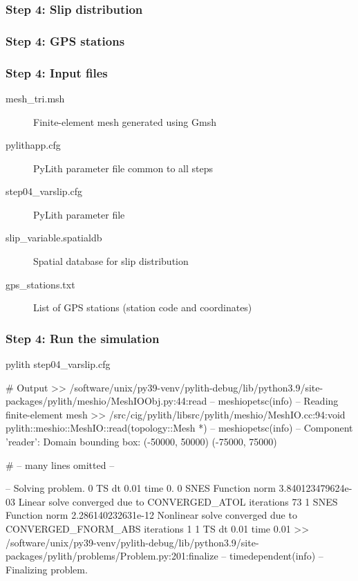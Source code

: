 \documentclass[aspectratio=169]{beamer}
\begin{document}
\begin{frame}
  \frametitle{Step 4: Slip distribution}
  \summary{}

    
\end{frame}


\begin{frame}
  \frametitle{Step 4: GPS stations}

    
\end{frame}


\begin{frame}
  \frametitle{Step 4: Input files}
  \summary{}

  \begin{description}
  \item[mesh\_tri.msh] Finite-element mesh generated using Gmsh
  \item[pylithapp.cfg] PyLith parameter file common to all steps
  \item[step04\_varslip.cfg] PyLith parameter file
  \item[slip\_variable.spatialdb] Spatial database for slip distribution
  \item[gps\_stations.txt] List of GPS stations (station code and coordinates)
  \end{description}
    
\end{frame}


\begin{frame}[fragile]
  \frametitle{Step 4: Run the simulation}
  \summary{}

\begin{bashcode}
pylith step04_varslip.cfg

# Output
 >> /software/unix/py39-venv/pylith-debug/lib/python3.9/site-packages/pylith/meshio/MeshIOObj.py:44:read
 -- meshiopetsc(info)
 -- Reading finite-element mesh
 >> /src/cig/pylith/libsrc/pylith/meshio/MeshIO.cc:94:void pylith::meshio::MeshIO::read(topology::Mesh *)
 -- meshiopetsc(info)
 -- Component 'reader': Domain bounding box:
    (-50000, 50000)
    (-75000, 75000)

# -- many lines omitted --

 -- Solving problem.
0 TS dt 0.01 time 0.
    0 SNES Function norm 3.840123479624e-03
    Linear solve converged due to CONVERGED_ATOL iterations 73
    1 SNES Function norm 2.286140232631e-12
  Nonlinear solve converged due to CONVERGED_FNORM_ABS iterations 1
1 TS dt 0.01 time 0.01
 >> /software/unix/py39-venv/pylith-debug/lib/python3.9/site-packages/pylith/problems/Problem.py:201:finalize
 -- timedependent(info)
 -- Finalizing problem.
\end{bashcode}
  
\end{frame}
\end{document}
